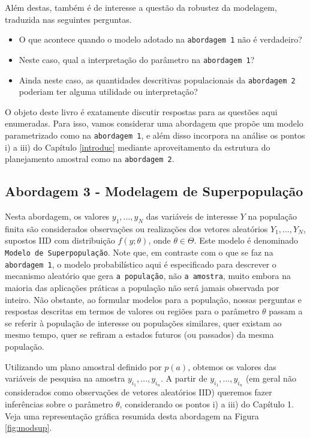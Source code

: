 \documentclass[]{book}
\providecommand{\tightlist}{%
  \setlength{\itemsep}{0pt}\setlength{\parskip}{0pt}}
\numberwithin{example}{chapter}
\numberwithin{remark}{chapter}
\numberwithin{definition}{chapter}
\begin{document}
Além destas, também é de interesse a questão da robustez da modelagem,
traduzida nas seguintes perguntas.

\begin{itemize}
\tightlist
\item
  O que acontece quando o modelo adotado na \texttt{abordagem\ 1} não é
  verdadeiro?
\item
  Neste caso, qual a interpretação do parâmetro na
  \texttt{abordagem\ 1}?
\item
  Ainda neste caso, as quantidades descritivas populacionais da
  \texttt{abordagem\ 2} poderiam ter alguma utilidade ou interpretação?
\end{itemize}

O objeto deste livro é exatamente discutir respostas para as questões
aqui enumeradas. Para isso, vamos considerar uma abordagem que propõe um
modelo parametrizado como na \texttt{abordagem\ 1}, e além disso
incorpora na análise os pontos i) a iii) do Capítulo \ref{introduc}
mediante aproveitamento da estrutura do planejamento amostral como na
\texttt{abordagem\ 2}.

\subsection{Abordagem 3 - Modelagem de
Superpopulação}\label{modelsuperpop}

Nesta abordagem, os valores \(y_{1},\ldots ,y_{N}\) das variáveis de
interesse \(Y\) na população finita são considerados observações ou
realizações dos vetores aleatórios \(Y_{1},\ldots ,Y_{N}\), supostos IID
com distribuição \(f(y;\theta)\), onde \(\theta \in \Theta\). Este
modelo é denominado \texttt{Modelo\ de\ Superpopulação}. Note que, em
contraste com o que se faz na \texttt{abordagem\ 1}, o modelo
probabilístico aqui é especificado para descrever o mecanismo aleatório
que gera \texttt{a\ população}, não \texttt{a\ amostra}, muito embora na
maioria das aplicações práticas a população não será jamais observada
por inteiro. Não obstante, ao formular modelos para a população, nossas
perguntas e respostas descritas em termos de valores ou regiões para o
parâmetro \(\theta\) passam a se referir à população de interesse ou
populações similares, quer existam ao mesmo tempo, quer se refiram a
estados futuros (ou passados) da mesma população.

Utilizando um plano amostral definido por \(p(a)\), obtemos os valores
das variáveis de pesquisa na amostra \(y_{i_1},\ldots ,y_{i_n}\). A
partir de \(y_{i_1},\ldots ,y_{i_n}\) (em geral não considerados como
observações de vetores aleatórios IID) queremos fazer inferências sobre
o parâmetro \(\theta\), considerando os pontos i) a iii) do Capítulo 1.
Veja uma representação gráfica resumida desta abordagem na Figura
\ref{fig:modsup}.
\end{document}
